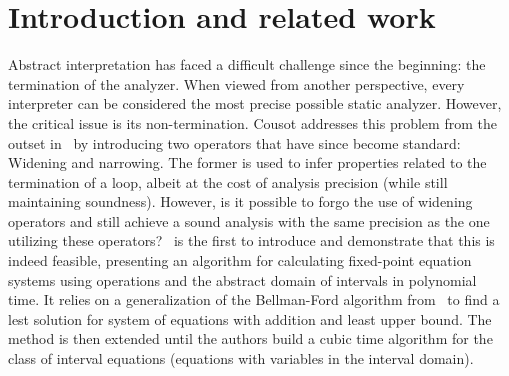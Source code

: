 \section{Introduction and related work}\label{sec:prev}

Abstract interpretation has faced a difficult challenge since the
beginning: the termination of the analyzer. When viewed from another
perspective, every interpreter can be considered the most precise
possible static analyzer. However, the critical issue is its
non-termination. Cousot addresses this problem from the outset
in~\cite{patrickradhia:one} by introducing two operators that have
since become standard: Widening and narrowing. The former is used to
infer properties related to the termination of a loop, albeit at the
cost of analysis precision (while still maintaining
soundness). However, is it possible to forgo the use of widening
operators and still achieve a sound analysis with the same precision
as the one utilizing these operators?\ \cite{Gawlitza2009} is the
first to introduce and demonstrate that this is indeed feasible,
presenting an algorithm for calculating fixed-point equation systems
using operations and the abstract domain of intervals in polynomial
time.  It relies on a generalization of the Bellman-Ford algorithm
from~\cite{bellman1958algo} to find a lest solution for system of
equations with addition and least upper bound. The method is then
extended until the authors build a cubic time algorithm for the class
of interval equations (equations with variables in the interval
domain).
